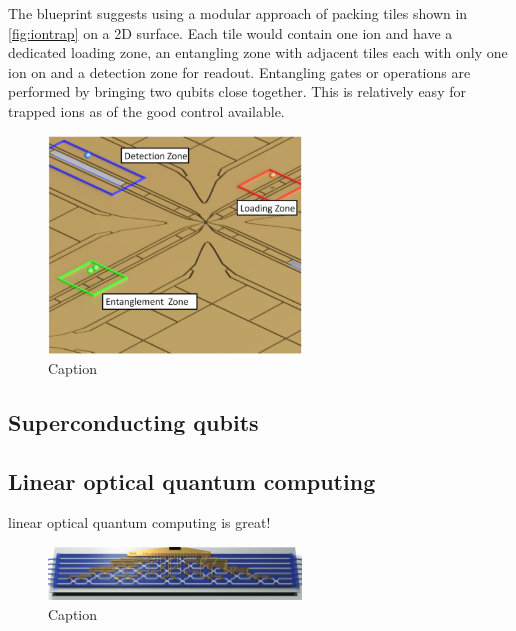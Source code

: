 The \cite{lekitsch2015blueprint} blueprint suggests using a modular approach of packing tiles shown in \autoref{fig:iontrap} on a 2D surface. Each tile would contain one ion and have a dedicated loading zone, an entangling zone with adjacent tiles each with only one ion on and a detection zone for readout. Entangling gates or operations are performed by bringing two qubits close together. This is relatively easy for trapped ions as of the good control available. 

\begin{figure}[h]
    \centering
    \includegraphics[width=0.6\textwidth]{figures/impl/iontrap.png}
    \caption{Caption \cite{lekitsch2015blueprint}}
    \label{fig:iontrap}
\end{figure}

\subsection{Superconducting qubits}


\subsection{Linear optical quantum computing}

linear optical quantum computing is great! 

\begin{figure}[h]
    \centering
    \includegraphics[width=0.6\textwidth]{figures/impl/rekkchip.png}
    \caption{Caption \cite{carolan2015universal}}
    \label{fig:my_label}
\end{figure}


